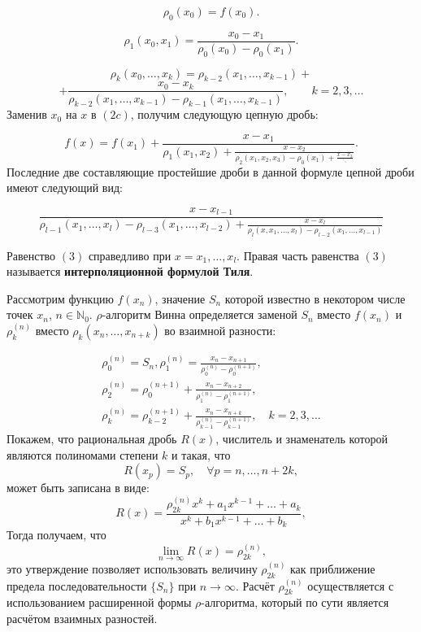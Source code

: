 \documentclass[14pt, a4paper]{extarticle}
\theoremstyle{definition}
\theoremstyle{remark}
\begin{document}
\[
\rho_{0}(x_{0}) = f(x_{0}).
\]

\[
\rho_{1}(x_{0},x_{1})
= \frac{x_{0}-x_{1}}{\rho_{0}(x_{0}) - \rho_{0}(x_{1})}.
\]

\begin{equation*}
\rho_{k}(x_{0},\ldots,x_{k})
=
\rho_{k-2}(x_{1},\ldots,x_{k-1})
+
\end{equation*}
\begin{equation*}
+    
\frac{x_{0}-x_{k}}{\rho_{k-2}(x_{1},\ldots,x_{k-1}) - \rho_{k-1}(x_{1}, \ldots,x_{k-1})},
\qquad k = 2,3,\ldots
\end{equation*}
Заменив \(x_{0}\) на \(x\) в \((2c)\), получим следующую цепную дробь:

\[
f(x) =
f(x_{1})
+ \frac{x-x_{1}}{\rho_{1}(x_{1},x_{2}) +
\frac{x-x_{2}}{\rho_{2}(x_{1},x_{2},x_{3}) - \rho_{0}(x_{1}) +
\frac{x-x_{3}}{\ddots}}}.
\]
Последние две составляющие простейшие дроби в данной формуле цепной дроби имеют следующий вид:

\[
\frac{
  x - x_{l-1}
}{
  \rho_{l-1}(x_{1},\ldots,x_{l}) - \rho_{l-3}(x_{1},\ldots,x_{l-2}) 
  + 
  \frac{x - x_{l}}{
    \rho_{l}(x,x_{1},\ldots,x_{l}) - \rho_{l-2}(x_{1},\ldots,x_{l-1})
  }
}
\]

Равенство \((3)\) справедливо при \(x = x_{1},\ldots,x_{l}\).  
Правая часть равенства \((3)\) называется \textbf{интерполяционной формулой Тиля}.

Рассмотрим функцию \(f(x_{n})\), значение \(S_{n}\) которой известно в некотором числе точек \(x_{n}\), \(n \in \mathbb{N}_{0}\). $\rho$-алгоритм Винна определяется заменой \(S_{n}\) вместо \(f(x_{n})\) и \(\rho_{k}^{(n)}\) вместо \(\rho_{k}(x_{n},\ldots,x_{n+k})\) во взаимной разности:

\begin{align*}
\rho_{0}^{(n)} = S_{n},
\rho_{1}^{(n)} = \frac{x_{n} - x_{n+1}}{\rho_{0}^{(n)} - \rho_{0}^{(n+1)}}, \\
\rho_{2}^{(n)} = \rho_{0}^{(n+1)} + \frac{x_{n} - x_{n+2}}{\rho_{1}^{(n)} - \rho_{1}^{(n+1)}}, \\
\rho_{k}^{(n)} = \rho_{k-2}^{(n+1)} + \frac{x_{n} - x_{n+k}}{\rho_{k-1}^{(n)} - \rho_{k-1}^{(n+1)}}, \quad k = 2,3,\ldots
\end{align*}
Покажем, что рациональная дробь \(R(x)\), числитель и знаменатель которой являются полиномами степени \(k\) и такая, что
\[
R(x_{p}) = S_{p}, \quad \forall p = n,\ldots,n+2k, 
\]
может быть записана в виде:
\[
R(x) = \frac{\rho_{2k}^{(n)} x^{k} + a_{1} x^{k-1} + \ldots + a_{k}}{x^{k} + b_{1} x^{k-1} + \ldots + b_{k}},
\]
Тогда получаем, что 
\[
\lim_{n \to \infty} R(x) = \rho_{2k}^{(n)},
\]
это утверждение позволяет использовать величину \(\rho_{2k}^{(n)}\) как приближение предела последовательности \(\{ S_{n} \}\) при \(n \to \infty\). Расчёт \(\rho_{2k}^{(n)}\) осуществляется с использованием расширенной формы \emph{$\rho$}-алгоритма, который по сути является расчётом взаимных разностей.
\end{document}
